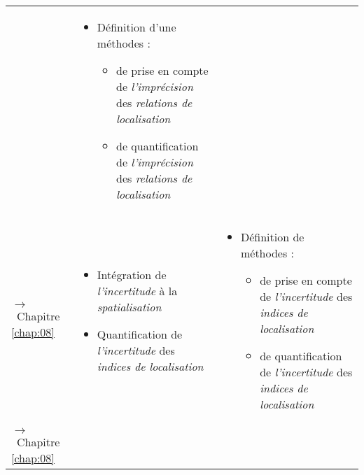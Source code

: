 \begin{tabular}{p{.2\textheight}>{\small}L{.35\textheight}>{\small}L{.35\textheight}}
\begin{minipage}[t]{.35\textheight}
  \end{minipage} & \begin{minipage}[t]{.35\textheight}
    \begin{itemize}
    \item Définition d'une méthodes :
      \begin{itemize}
      \item de prise en compte de \emph{l’imprécision} des
        \emph{relations de localisation}
      \item de quantification de \emph{l'imprécision} des
        \emph{relations de localisation}
      \end{itemize}
    \end{itemize}
  \end{minipage} \\
{\par\footnotesize\hspace{.25cm}$\longrightarrow$~Chapitre
\ref{chap:08}} & \begin{minipage}[t]{.35\textheight}
    \begin{itemize}
    \item Intégration de \emph{l'incertitude} à la
      \emph{spatialisation}
    \item Quantification de \emph{l'incertitude} des \emph{indices de
        localisation}
    \end{itemize}
  \end{minipage}& \begin{minipage}[t]{.35\textheight}
    \begin{itemize}
    \item Définition de méthodes :
      \begin{itemize}
      \item de prise en compte de \emph{l’incertitude} des
        \emph{indices de localisation}
      \item de quantification de \emph{l'incertitude} des
        \emph{indices de localisation}
      \end{itemize}
    \end{itemize}
  \end{minipage} \\
{\par\footnotesize\hspace{.25cm}$\longrightarrow$~Chapitre
\ref{chap:08}} & \begin{minipage}[t]{.35\textheight}

\end{minipage}
\end{tabular}
